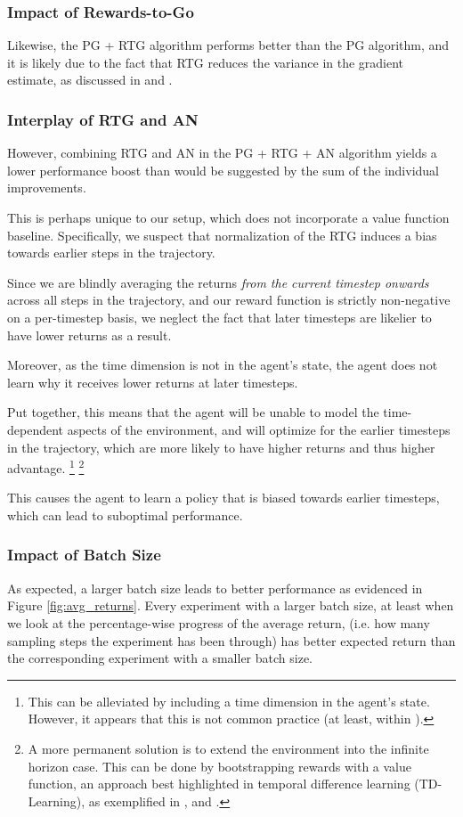 \documentclass{article} %
\begin{document}
\subsubsection{Impact of Rewards-to-Go}
Likewise, the PG + RTG algorithm performs better than the PG algorithm,
and it is likely due to the fact that RTG reduces the variance in the gradient estimate,
as discussed in \cite{Levine-et-al-2023} and \cite{Week2}.

\subsubsection{Interplay of RTG and AN}
However, combining RTG and AN in the PG + RTG + AN algorithm yields a lower performance boost
than would be suggested by the sum of the individual improvements.

This is perhaps unique to our setup, which does not incorporate a value function baseline.
Specifically, we suspect that normalization of the RTG induces a bias towards earlier steps in the trajectory.

Since we are blindly averaging the returns \textit{from the current timestep onwards} across all steps in the trajectory, 
and our reward function is strictly non-negative on a per-timestep basis,
we neglect the fact that later timesteps are likelier to have lower returns as a result. 

Moreover, as the time dimension is not in the agent's state,
the agent does not learn why it receives lower returns at later timesteps.

Put together, this means that the agent will be unable to model the time-dependent aspects of the environment,
and will optimize for the earlier timesteps in the trajectory, which are more likely to have higher returns
and thus higher advantage.
\footnote{
    This can be alleviated by including a time dimension in the agent's state.
    However, it appears that this is not common practice (at least, within \cite{Towers-et-al-2024}).
}
\footnote{
    A more permanent solution is to extend the environment into the infinite horizon case.
    This can be done by bootstrapping rewards with a value function,
    an approach best highlighted in temporal difference learning (TD-Learning),
    as exemplified in \cite{Sutton-1988}, and \cite{Schulman-et-al-2018}.
}

This causes the agent to learn a policy that is biased towards earlier timesteps,
which can lead to suboptimal performance.

\subsubsection{Impact of Batch Size}
As expected, a larger batch size leads to better performance as evidenced in Figure \ref{fig:avg_returns}.
Every experiment with a larger batch size, at least when we look at the percentage-wise progress of the average return,
(i.e. how many sampling steps the experiment has been through)
has better expected return than the corresponding experiment with a smaller batch size.
\end{document}
